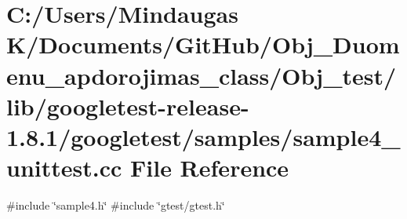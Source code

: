 \hypertarget{_obj__test_2lib_2googletest-release-1_88_81_2googletest_2samples_2sample4__unittest_8cc}{}\section{C\+:/\+Users/\+Mindaugas K/\+Documents/\+Git\+Hub/\+Obj\+\_\+\+Duomenu\+\_\+apdorojimas\+\_\+class/\+Obj\+\_\+test/lib/googletest-\/release-\/1.8.1/googletest/samples/sample4\+\_\+unittest.cc File Reference}
\label{_obj__test_2lib_2googletest-release-1_88_81_2googletest_2samples_2sample4__unittest_8cc}
{\ttfamily \#include \char`\"{}sample4.\+h\char`\"{}}\newline
{\ttfamily \#include \char`\"{}gtest/gtest.\+h\char`\"{}}\newline
